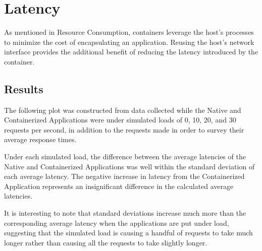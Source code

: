 \documentclass{article}
\begin{document}
\section{Latency}
As mentioned in Resource Consumption, containers leverage the host's processes to minimize the cost of encapsulating an application. Reusing the host's network interface provides the additional benefit of reducing the latency introduced by the container.

\subsection{Results}
The following plot was constructed from data collected while the Native and Containerized Applications were under simulated loads of 0, 10, 20, and 30 requests per second, in addition to the requests made in order to survey their average response times.


Under each simulated load, the difference between the average latencies of the Native and Containerized Applications was well within the standard deviation of each average latency. The negative increase in latency from the Containerized Application represents an insignificant difference in the calculated average latencies.

It is interesting to note that standard deviations increase much more than the corresponding average latency when the applications are put under load, suggesting that the simulated load is causing a handful of requests to take much longer rather than causing all the requests to take slightly longer.
\end{document}
